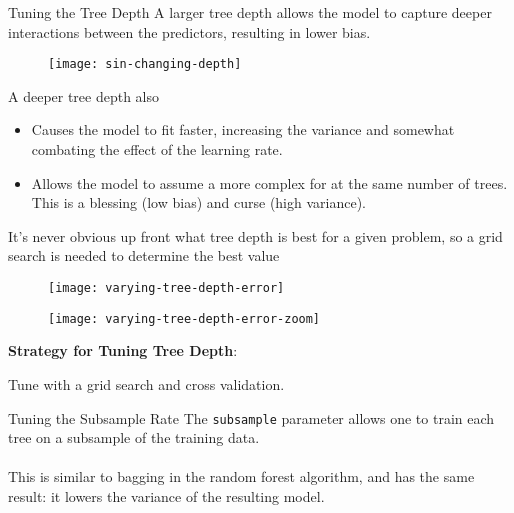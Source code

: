 %
\begin{frame}{Tuning the Tree Depth}
A larger tree depth allows the model to capture deeper interactions between the predictors, resulting in lower bias.

  \begin{figure}
    \texttt{[image: sin-changing-depth]}
  \end{figure}

\end{frame}
%
\begin{frame}
A deeper tree depth also

\begin{itemize}
  \item Causes the model to fit faster, increasing the variance and somewhat combating the effect of the learning rate.
  \item Allows the model to assume a more complex for at the same number of trees.  This is a blessing (low bias) and curse (high variance).
\end{itemize}
\end{frame}
%
\begin{frame}
It's never obvious up front what tree depth is best for a given problem, so a grid search is needed to determine the best value

  \begin{figure}
    \texttt{[image: varying-tree-depth-error]}
  \end{figure}
  
\end{frame}
%
\begin{frame}

  \begin{figure}
    \texttt{[image: varying-tree-depth-error-zoom]}
  \end{figure}
  
\end{frame}
%
\begin{frame}
\textbf{Strategy for Tuning Tree Depth}:

Tune with a grid search and cross validation.
  
\end{frame}
%
\begin{frame}{Tuning the Subsample Rate}
The \texttt{subsample} parameter allows one to train each tree on a subsample of the training data.\\~\\

This is similar to bagging in the random forest algorithm, and has the same result: it lowers the variance of the resulting model.
\end{frame}
